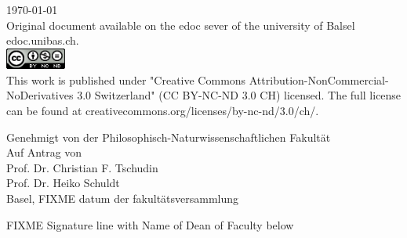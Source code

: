\begin{titlepage}
\begin{center}

{\large \today\\[1cm]}
{\footnotesize Original document available on the edoc sever of the university of Balsel edoc.unibas.ch.\\[0.5cm]
\includegraphics[height=7mm]{./inc/cc_lic}~\\[0.5cm]
This work is published under  "Creative Commons Attribution-NonCommercial-NoDerivatives 3.0 Switzerland" (CC BY-NC-ND 3.0 CH) licensed. The full license can be found at creativecommons.org/licenses/by-nc-nd/3.0/ch/.
}

\end{center}
\end{titlepage}

\begin{titlepage}
\pagecolor{orange}\afterpage{\nopagecolor}
\begin{center}
Genehmigt von der Philosophisch-Naturwissenschaftlichen Fakultät\\
Auf Antrag von\\
Prof. Dr. Christian F. Tschudin\\Prof. Dr. Heiko Schuldt\\
\vfill 
Basel, FIXME datum der fakultätsversammlung
{\raggedright FIXME Signature line with Name of Dean of Faculty below}

\end{center}
\end{titlepage}


